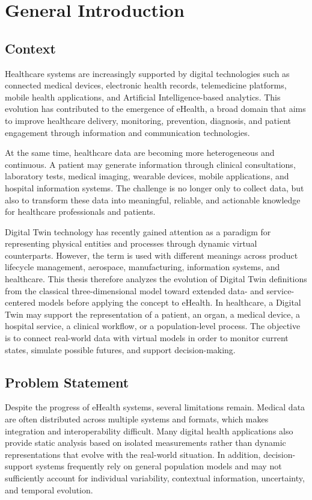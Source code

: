 \chapter{General Introduction}

\section{Context}
Healthcare systems are increasingly supported by digital technologies such as connected medical devices, electronic health records, telemedicine platforms, mobile health applications, and Artificial Intelligence-based analytics. This evolution has contributed to the emergence of eHealth, a broad domain that aims to improve healthcare delivery, monitoring, prevention, diagnosis, and patient engagement through information and communication technologies.

At the same time, healthcare data are becoming more heterogeneous and continuous. A patient may generate information through clinical consultations, laboratory tests, medical imaging, wearable devices, mobile applications, and hospital information systems. The challenge is no longer only to collect data, but also to transform these data into meaningful, reliable, and actionable knowledge for healthcare professionals and patients.

Digital Twin technology has recently gained attention as a paradigm for representing physical entities and processes through dynamic virtual counterparts. However, the term is used with different meanings across product lifecycle management, aerospace, manufacturing, information systems, and healthcare. This thesis therefore analyzes the evolution of Digital Twin definitions from the classical three-dimensional model toward extended data- and service-centered models before applying the concept to eHealth. In healthcare, a Digital Twin may support the representation of a patient, an organ, a medical device, a hospital service, a clinical workflow, or a population-level process. The objective is to connect real-world data with virtual models in order to monitor current states, simulate possible futures, and support decision-making.

\section{Problem Statement}
Despite the progress of eHealth systems, several limitations remain. Medical data are often distributed across multiple systems and formats, which makes integration and interoperability difficult. Many digital health applications also provide static analysis based on isolated measurements rather than dynamic representations that evolve with the real-world situation. In addition, decision-support systems frequently rely on general population models and may not sufficiently account for individual variability, contextual information, uncertainty, and temporal evolution.

